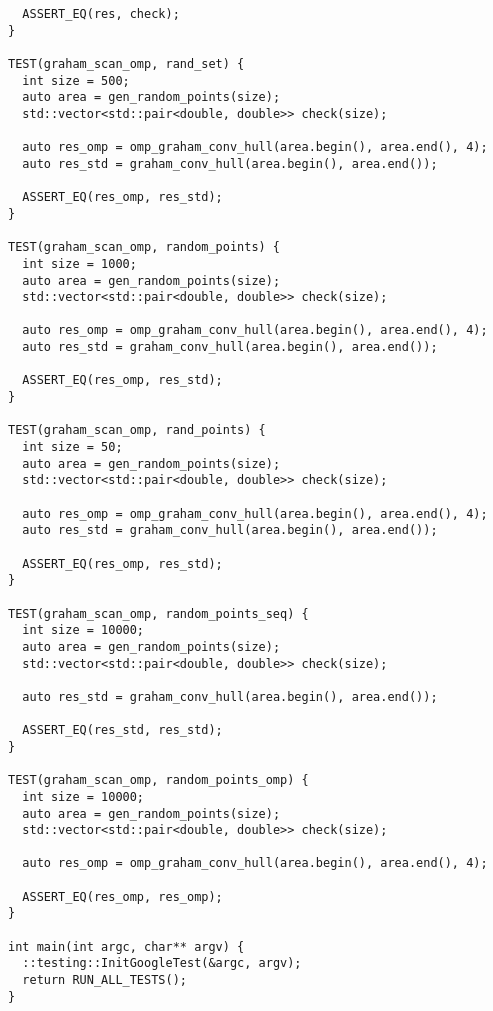 \documentclass{report}
\begin{document}
\begin{lstlisting}
  ASSERT_EQ(res, check);
}

TEST(graham_scan_omp, rand_set) {
  int size = 500;
  auto area = gen_random_points(size);
  std::vector<std::pair<double, double>> check(size);

  auto res_omp = omp_graham_conv_hull(area.begin(), area.end(), 4);
  auto res_std = graham_conv_hull(area.begin(), area.end());

  ASSERT_EQ(res_omp, res_std);
}

TEST(graham_scan_omp, random_points) {
  int size = 1000;
  auto area = gen_random_points(size);
  std::vector<std::pair<double, double>> check(size);

  auto res_omp = omp_graham_conv_hull(area.begin(), area.end(), 4);
  auto res_std = graham_conv_hull(area.begin(), area.end());

  ASSERT_EQ(res_omp, res_std);
}

TEST(graham_scan_omp, rand_points) {
  int size = 50;
  auto area = gen_random_points(size);
  std::vector<std::pair<double, double>> check(size);

  auto res_omp = omp_graham_conv_hull(area.begin(), area.end(), 4);
  auto res_std = graham_conv_hull(area.begin(), area.end());

  ASSERT_EQ(res_omp, res_std);
}

TEST(graham_scan_omp, random_points_seq) {
  int size = 10000;
  auto area = gen_random_points(size);
  std::vector<std::pair<double, double>> check(size);

  auto res_std = graham_conv_hull(area.begin(), area.end());

  ASSERT_EQ(res_std, res_std);
}

TEST(graham_scan_omp, random_points_omp) {
  int size = 10000;
  auto area = gen_random_points(size);
  std::vector<std::pair<double, double>> check(size);

  auto res_omp = omp_graham_conv_hull(area.begin(), area.end(), 4);

  ASSERT_EQ(res_omp, res_omp);
}

int main(int argc, char** argv) {
  ::testing::InitGoogleTest(&argc, argv);
  return RUN_ALL_TESTS();
}

\end{lstlisting}
\end{document}
